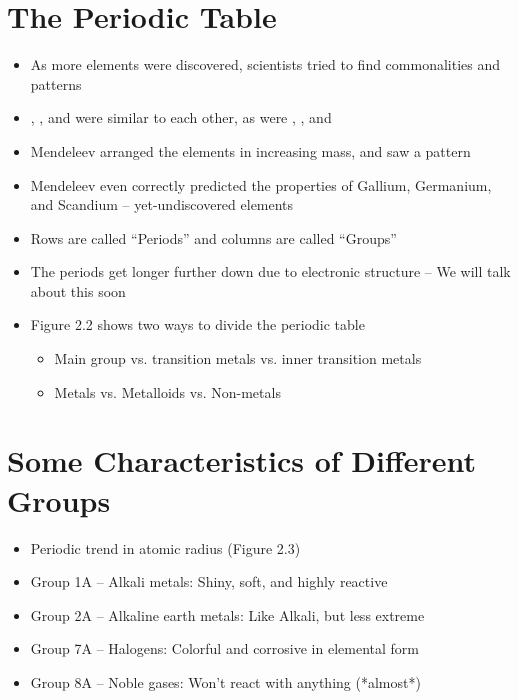 \documentclass[12pt, openany, letterpaper]{memoir}
\begin{document}
\section{The Periodic Table}
\begin{itemize}
	\item As more elements were discovered, scientists tried to find commonalities and patterns
	\item {}, , and  were similar to each other, as were , , and 
	\item Mendeleev arranged the elements in increasing mass, and saw a pattern
	\item Mendeleev even correctly predicted the properties of Gallium, Germanium, and Scandium -- yet-undiscovered elements
	\item Rows are called ``Periods'' and columns are called ``Groups''
	\item The periods get longer further down due to electronic structure -- We will talk about this soon
	\item Figure 2.2 shows two ways to divide the periodic table
	\begin{itemize}
		\item Main group vs. transition metals vs. inner transition metals
		\item Metals vs. Metalloids vs. Non-metals
	\end{itemize}
\end{itemize}

\section{Some Characteristics of Different Groups}
\begin{itemize}
	\item Periodic trend in atomic radius (Figure 2.3)
	\item Group 1A -- Alkali metals: Shiny, soft, and highly reactive
	\item Group 2A -- Alkaline earth metals: Like Alkali, but less extreme
	\item Group 7A -- Halogens: Colorful and corrosive in elemental form
	\item Group 8A -- Noble gases: Won't react with anything (*almost*)
\end{itemize}
\end{document}
